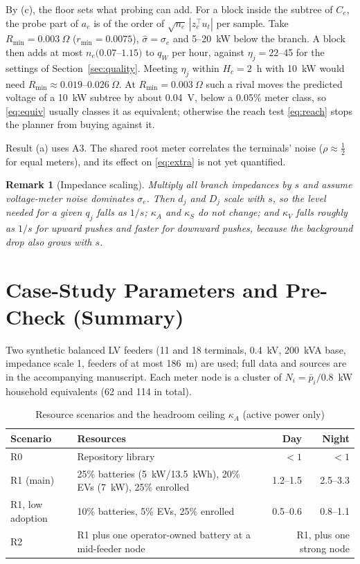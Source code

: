 \documentclass[journal,onecolumn,11pt]{IEEEtran}
\newtheorem{remark}{Remark}
\newcommand{\tp}{^{\top}}
\begin{document}
By (c), the floor sets what probing can add. For a block inside the subtree of $C_e$, the probe part of $a_e$ is of the order of $\sqrt{n_e}\,|z_e\tp u_t|$ per sample. Take $R_{\min}=0.003~\Omega$ ($r_{\min}=0.0075$), $\hat\sigma=\sigma_e$ and 5--20~kW below the branch. A block then adds at most $n_e(0.07$--$1.15)$ to $q_W$ per hour, against $\eta_j=22$--45 for the settings of Section~\ref{sec:quality}. Meeting $\eta_j$ within $H_c=2$~h with 10~kW would need $R_{\min}\approx0.019$--$0.026~\Omega$. At $R_{\min}=0.003~\Omega$ such a rival moves the predicted voltage of a 10~kW subtree by about 0.04~V, below a 0.05\% meter class, so \eqref{eq:equiv} usually classes it as equivalent; otherwise the reach test \eqref{eq:reach} stops the planner from buying against it.

Result (a) uses A3. The shared root meter correlates the terminals' noise ($\rho\approx\tfrac12$ for equal meters), and its effect on \eqref{eq:extra} is not yet quantified.

\begin{remark}[Impedance scaling]
Multiply all branch impedances by $s$ and assume voltage-meter noise dominates $\sigma_e$. Then $d_j$ and $D_j$ scale with $s$, so the level needed for a given $q_j$ falls as $1/s$; $\kappa_A$ and $\kappa_S$ do not change; and $\kappa_V$ falls roughly as $1/s$ for upward pushes and faster for downward pushes, because the background drop also grows with $s$.
\end{remark}

\section{Case-Study Parameters and Pre-Check (Summary)}
Two synthetic balanced LV feeders (11 and 18 terminals, 0.4~kV, 200~kVA base, impedance scale 1, feeders of at most 186~m) are used; full data and sources are in the accompanying manuscript. Each meter node is a cluster of $N_i=\bar p_i/0.8$~kW household equivalents (62 and 114 in total).

\begin{table}[h]
\centering
\caption{Resource scenarios and the headroom ceiling $\kappa_A$ (active power only)}
\begin{tabular}{@{}llrr@{}}
\toprule
Scenario & Resources & Day & Night\\
\midrule
R0 & Repository library & $<1$ & $<1$\\
R1 (main) & 25\% batteries (5~kW/13.5~kWh), 20\% EVs (7~kW), 25\% enrolled & 1.2--1.5 & 2.5--3.3\\
R1, low adoption & 10\% batteries, 5\% EVs, 25\% enrolled & 0.5--0.6 & 0.8--1.1\\
R2 & R1 plus one operator-owned battery at a mid-feeder node & \multicolumn{2}{r}{R1, plus one strong node}\\
\bottomrule
\end{tabular}
\end{table}
\end{document}
